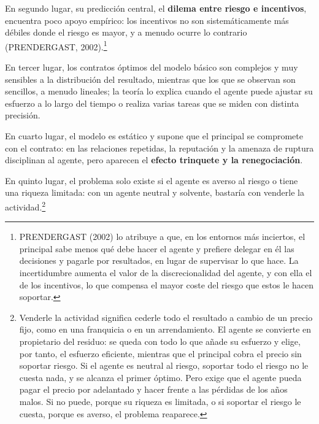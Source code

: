 \documentclass[10pt,a4paper]{article}
\begin{document}
En segundo lugar, su predicción central, el \textbf{dilema entre riesgo e incentivos}, encuentra poco apoyo empírico: los incentivos no son sistemáticamente más débiles donde el riesgo es mayor, y a menudo ocurre lo contrario (PRENDERGAST, 2002).\footnote{%
    PRENDERGAST (2002) lo atribuye a que, en los entornos más inciertos, el principal sabe menos qué debe hacer el agente y prefiere delegar en él las decisiones y pagarle por resultados, en lugar de supervisar lo que hace. La incertidumbre aumenta el valor de la discrecionalidad del agente, y con ella el de los incentivos, lo que compensa el mayor coste del riesgo que estos le hacen soportar.
}

En tercer lugar, los contratos óptimos del modelo básico son complejos y muy sensibles a la distribución del resultado, mientras que los que se observan son sencillos, a menudo lineales; la teoría lo explica cuando el agente puede ajustar su esfuerzo a lo largo del tiempo o realiza varias tareas que se miden con distinta precisión.

En cuarto lugar, el modelo es estático y supone que el principal se compromete con el contrato: en las relaciones repetidas, la reputación y la amenaza de ruptura disciplinan al agente, pero aparecen el \textbf{efecto trinquete y la renegociación}.

En quinto lugar, el problema solo existe si el agente es averso al riesgo o tiene una riqueza limitada: con un agente neutral y solvente, bastaría con venderle la actividad.\footnote{%
    Venderle la actividad significa cederle todo el resultado a cambio de un precio fijo, como en una franquicia o en un arrendamiento. El agente se convierte en propietario del residuo: se queda con todo lo que añade su esfuerzo y elige, por tanto, el esfuerzo eficiente, mientras que el principal cobra el precio sin soportar riesgo. Si el agente es neutral al riesgo, soportar todo el riesgo no le cuesta nada, y se alcanza el primer óptimo. Pero exige que el agente pueda pagar el precio por adelantado y hacer frente a las pérdidas de los años malos. Si no puede, porque su riqueza es limitada, o si soportar el riesgo le cuesta, porque es averso, el problema reaparece.
}
\end{document}
